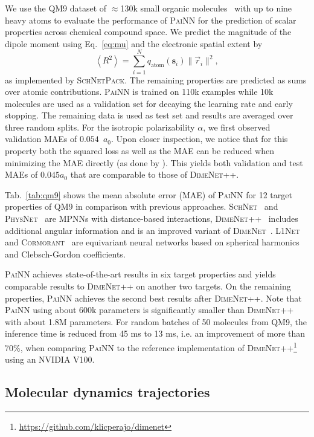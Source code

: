 \documentclass[reprint,
amsmath,amssymb,
 aip,jcp
]{revtex4-2}
\newcommand{\painn}{\textsc{PaiNN}}
\newcommand{\q}{\mathbf{s}}
\begin{document}
We use the QM9 dataset of $\approx$130k small organic molecules~\cite{ramakrishnan2014quantum} with up to nine heavy atoms to evaluate the performance of \painn{} for the prediction of scalar properties across chemical compound space.
We predict the magnitude of the dipole moment using Eq.~\ref{eq:mu} and the electronic spatial extent by
\[
\left\langle R^2 \right\rangle =  \sum_{i=1}^N q_\text{atom}(\q_i) \| \vec{r}_i\|^2,
\]
as implemented by \textsc{SchNetPack}.
The remaining properties are predicted as sums over atomic contributions.
\painn{} is trained on 110k examples while 10k molecules are used as a validation set for decaying the learning rate and early stopping. 
The remaining data is used as test set and results are averaged over three random splits.
For the isotropic polarizability $\alpha$, we first observed validation MAEs of $0.054$~$a_0$.
Upon closer inspection, we notice that for this property both the squared loss as well as the MAE can be reduced when minimizing the MAE directly (as done by \citet{klicpera2020fast}).
This yields both validation and test MAEs of $0.045 a_0$ that are comparable to those of \textsc{DimeNet++}.

Tab.~\ref{tab:qm9} shows the mean absolute error (MAE) of \painn{} for 12 target properties of QM9 in comparison with previous approaches.
\textsc{SchNet}~\cite{schutt2017schnet} and \textsc{PhysNet}~\cite{unke2019physnet} are MPNNs with distance-based interactions, \textsc{DimeNet}++~\cite{klicpera2020fast} includes additional angular information and is an improved variant of \textsc{DimeNet}~\cite{klicpera2020directional}. \textsc{L1Net}~\cite{miller2020relevance} and \textsc{Cormorant}~\cite{anderson2019cormorant} are equivariant neural networks based on spherical harmonics and Clebsch-Gordon coefficients.

\painn{} achieves state-of-the-art results in six target properties and yields comparable results to \textsc{DimeNet}++ on another two targets.
On the remaining properties, \painn{} achieves the second best results after \textsc{DimeNet}++.
Note that \painn{} using about 600k parameters is significantly smaller than \textsc{DimeNet}++ with about 1.8M parameters.
For random batches of 50 molecules from QM9, the inference time is reduced from 45 ms to 13 ms, i.e. an improvement of more than 70\%, when comparing \painn{} to the reference implementation of \textsc{DimeNet}++\footnote{\url{https://github.com/klicperajo/dimenet}} using an NVIDIA V100.

\subsection{Molecular dynamics trajectories}
\end{document}
